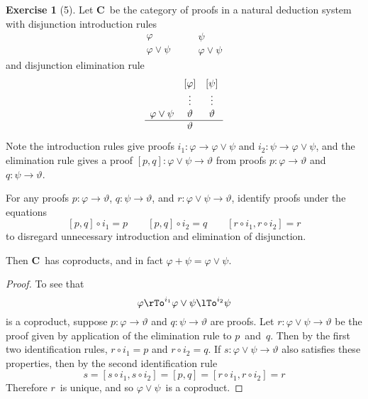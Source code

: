 \documentclass[letterpaper,12pt]{article}
\newcommand{\after}{\circ}
\newcommand{\copair}[2]{[{#1},{#2}]}
\newcommand{\cat}[1]{\mathbf{#1}}
\newcommand{\2}{\cat{2}}
\newcommand{\C}{\cat{C}}
\theoremstyle{definition}
\newtheorem*{exer}{Exercise}
\theoremstyle{remark}
\theoremstyle{direction}
\begin{document}
\begin{exer}[5]
Let \(\C\)~be the category of proofs in a natural deduction system with disjunction introduction rules
\[\begin{array}{c}
\varphi\\
\hline
\varphi\lor\psi
\end{array}
\qquad
\begin{array}{c}
\psi\\
\hline
\varphi\lor\psi
\end{array}\]
and disjunction elimination rule
\[\begin{array}{ccc}
&[\varphi]&[\psi]\\
&\vdots&\vdots\\
\varphi\lor\psi&\vartheta&\vartheta\\
\hline
&\vartheta&
\end{array}\]
Note the introduction rules give proofs \(i_1:\varphi\to\varphi\lor\psi\) and \(i_2:\psi\to\varphi\lor\psi\), and the elimination rule gives a proof \(\copair{p}{q}:\varphi\lor\psi\to\vartheta\) from proofs \(p:\varphi\to\vartheta\) and \(q:\psi\to\vartheta\).

For any proofs \(p:\varphi\to\vartheta\), \(q:\psi\to\vartheta\), and \(r:\varphi\lor\psi\to\vartheta\), identify proofs under the equations
\[\copair{p}{q}\after i_1=p\qquad \copair{p}{q}\after i_2=q\qquad [r\after i_1,r\after i_2]=r\]
to disregard unnecessary introduction and elimination of disjunction.

Then \(\C\)~has coproducts, and in fact \(\varphi+\psi=\varphi\lor\psi\).
\end{exer}
\begin{proof}
To see that
\[\varphi\rTo^{i_1}\varphi\lor\psi\lTo^{i_2}\psi\]
is a coproduct, suppose \(p:\varphi\to\vartheta\) and \(q:\psi\to\vartheta\) are proofs. Let \(r:\varphi\lor\psi\to\vartheta\) be the proof given by application of the elimination rule to \(p\)~and~\(q\). Then by the first two identification rules, \(r\after i_1=p\) and \(r\after i_2=q\). If \(s:\varphi\lor\psi\to\vartheta\) also satisfies these properties, then by the second identification rule
\[s=[s\after i_1,s\after i_2]=[p,q]=[r\after i_1,r\after i_2]=r\]
Therefore \(r\)~is unique, and so \(\varphi\lor\psi\)~is a coproduct.
\end{proof}
\end{document}
